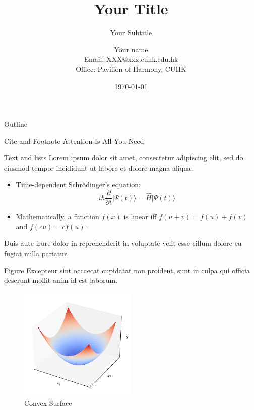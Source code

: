 \documentclass{beamer}
\title[Short title]{Your Title}
\subtitle{Your Subtitle}
\author[Short name]{
    Your name \\
    \vspace{0.1in}
    \footnotesize{Email: XXX@xxx.cuhk.edu.hk} \\
    \footnotesize{Office: Pavilion of Harmony, CUHK}}
\institute[CUHK]{The Chinese University of Hong Kong}
\date{\today}
\begin{document}
\frame[plain]{\maketitle}

\begin{frame}{Outline}
    \label{outline}
    \tableofcontents
\end{frame}




\begin{frame}{Cite and Footnote}
    Attention Is All You Need \supercite{Vaswani2017Attention} 
\end{frame}


\begin{frame}{Text and lists}
    Lorem ipsum dolor sit amet, consectetur adipiscing elit, sed do eiusmod tempor incididunt ut labore et dolore magna aliqua. \pause
    \begin{itemize}
      \item Time-dependent Schr\"{o}dinger's equation: $$i \hbar \frac{\partial}{\partial t}\lvert\Psi(t)\rangle = \hat H \lvert\Psi(t)\rangle$$ \pause
      \item Mathematically, a function $f(x)$ is linear iff $f(u+v)=f(u)+f(v)$ and $f(cu)=cf(u)$. \pause
    \end{itemize} \pause
    \vspace{0.1in}
    Duis aute irure dolor in reprehenderit in voluptate velit esse cillum dolore eu fugiat nulla pariatur. \pause
\end{frame}

\begin{frame}{Figure}
    Excepteur sint occaecat cupidatat non proident, sunt in culpa qui officia deserunt mollit anim id est laborum.
    \begin{figure}
        \includegraphics[width=0.5\textwidth]{images/convex_surface.png}
    \caption{Convex Surface}
    \end{figure}
\end{frame}
\end{document}
